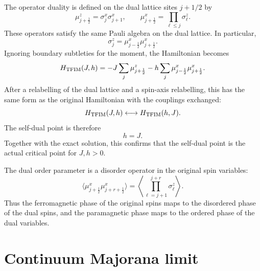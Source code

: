 The operator duality is defined on the dual lattice sites $j+1/2$ by
\begin{equation}
\label{eq:tfim-dual-operators}
    \mu_{j+\frac12}^z
    =
    \sigma_j^x\sigma_{j+1}^x,
    \qquad
    \mu_{j+\frac12}^x
    =
    \prod_{\ell\leq j}\sigma_\ell^z.
\end{equation}
These operators satisfy the same Pauli algebra on the dual lattice.  In
particular,
\begin{equation}
\label{eq:tfim-dual-field-term}
    \sigma_j^z
    =
    \mu_{j-\frac12}^x\mu_{j+\frac12}^x.
\end{equation}
Ignoring boundary subtleties for the moment, the Hamiltonian becomes
\begin{equation}
\label{eq:tfim-dual-hamiltonian}
    H_{\rm TFIM}(J,h)
    =
    -J\sum_j\mu_{j+\frac12}^z
    -h\sum_j\mu_{j-\frac12}^x\mu_{j+\frac12}^x.
\end{equation}
After a relabelling of the dual lattice and a spin-axis relabelling, this has the
same form as the original Hamiltonian with the couplings exchanged:
\begin{equation}
\label{eq:tfim-coupling-exchange}
    H_{\rm TFIM}(J,h)
    \longleftrightarrow
    H_{\rm TFIM}(h,J).
\end{equation}
The self-dual point is therefore
\begin{equation}
\label{eq:tfim-self-dual-point}
    h=J.
\end{equation}
Together with the exact solution, this confirms that the self-dual point is the
actual critical point for $J,h>0$.

The dual order parameter is a disorder operator in the original spin variables:
\begin{equation}
\label{eq:tfim-disorder-correlator}
    \langle \mu_{j+\frac12}^x\mu_{j+r+\frac12}^x\rangle
    =
    \left\langle
    \prod_{\ell=j+1}^{j+r}\sigma_\ell^z
    \right\rangle.
\end{equation}
Thus the ferromagnetic phase of the original spins maps to the disordered phase
of the dual spins, and the paramagnetic phase maps to the ordered phase of the
dual variables.

\section{Continuum Majorana limit}
\label{sec:tfim-continuum-majorana-limit}

